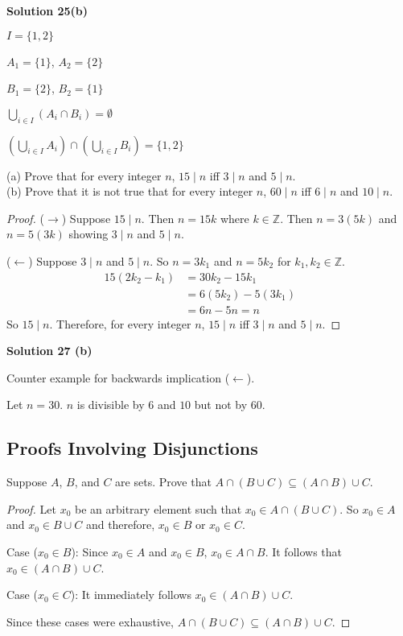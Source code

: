 \textbf{Solution 25(b)}

$I = \{1, 2\}$

$A_1 = \{1\}$,  $A_2 = \{2\}$

$B_1 =\{2\}$, $B_2 = \{1\}$

$\bigcup_{i \in I} (A_i \cap B_i) = \emptyset$

$(\bigcup_{i \in I} A_i) \cap (\bigcup_{i \in I} B_i) = \{1, 2\}$

\begin{tcolorbox}[title=Problem 27, breakable]
    (a) Prove that for every integer $n$, $15 \mid n$ iff $3 \mid n$ and $5 \mid n$. \\
    (b) Prove that it is not true that for every integer $n$, $60 \mid n$ iff $6 \mid n$
    and $10 \mid n$.
\end{tcolorbox}

\begin{proof}
    ($\rightarrow$) Suppose $15 \mid n$. Then $n = 15k$ where $k \in \mathbb{Z}$.
    Then $n = 3(5k)$ and $n = 5(3k)$ showing $3 \mid n$ and $5 \mid n$.

    ($\leftarrow$) Suppose $3 \mid n$ and $5 \mid n$.
    So $n = 3k_1$ and $n = 5k_2$ for $k_1, k_2 \in \mathbb{Z}$.
    \begin{align*}
        15(2k_2 - k_1) & = 30k_2 - 15k_1     &  & \\
                       & = 6(5k_2) - 5(3k_1) &  & \\
                       & = 6n - 5n = n
    \end{align*}
    So $15 \mid n$.
    Therefore, for every integer $n$, $15 \mid n$ iff $3 \mid n$ and $5 \mid n$.
\end{proof}

\textbf{Solution 27 (b)}

Counter example for backwards implication ($\leftarrow$).

Let $n = 30$. $n$ is divisible by $6$ and $10$ but not by $60$.

\subsection{Proofs Involving Disjunctions}

\begin{tcolorbox}[title=Problem 1, breakable]
    Suppose $A$, $B$, and $C$ are sets. 
    Prove that $A \cap (B \cup C) \subseteq (A \cap B) \cup C$.
\end{tcolorbox}

\begin{proof}
    Let $x_0$ be an arbitrary element such that $x_0 \in A \cap (B \cup C)$.
    So $x_0 \in A$ and $x_0 \in B \cup C$ and therefore, $x_0 \in B$ or $x_0 \in C$.

    Case ($x_0 \in B$): Since $x_0 \in A$ and $x_0 \in B$, $x_0 \in A \cap B$. It
    follows that $x_0 \in (A \cap B) \cup C$.

    Case ($x_0 \in C$): It immediately follows $x_0 \in (A \cap B) \cup C$.

    Since these cases were exhaustive, $A \cap (B \cup C) \subseteq (A \cap B) \cup
        C$.
\end{proof}

